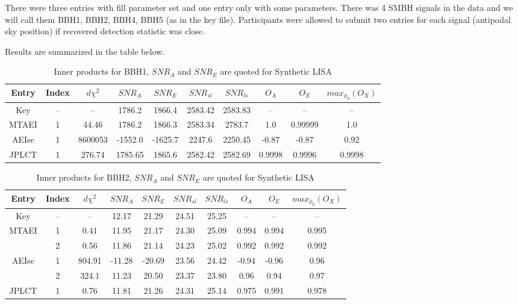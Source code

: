 \documentclass[prd,aps,amsfonts,amsmath, nofootinbib]{revtex4}
\begin{document}
There were three entries with fill parameter set and one entry only with 
some parameters.
There was 4 SMBH signals in the data and we will call them BBH1, BBH2, BBH4, BBH5
(as in the key file). Participants were allowed to submit two entries for
each signal (antipodal sky position) if recovered detection statistic was close.

Results are summarized in the table below.

\begin{table}
\caption{\label{BBH1} Inner products for BBH1, $SNR_A$ and $SNR_E$ are
quoted for Synthetic LISA}
\begin{ruledtabular}
\begin{tabular}{|c|c|c|c|c|c|c|c|c|c|}
Entry & Index & $d\chi^2$ & $SNR_A$ & $SNR_E$ & $SNR_{sl}$ & $SNR_{ls}$ & $O_A$ & $O_E$ & $max_{\phi_0}(O_X)$\\
\hline
Key & -- & -- & 1786.2 & 1866.4 & 2583.42 & 2583.83 & -- & -- & -- \\
\hline
MTAEI & 1 & 44.46 & 1786.2 & 1866.3 & 2583.34 & 2783.7 &1.0 & 0.99999 & 1.0   \\
\hline
AEIse & 1 & 8600053 & -1552.0 & -1625.7 & 2247.6 & 2250.45 &-0.87 & -0.87 &  0.92  \\
\hline
JPLCT & 1 & 276.74 & 1785.65 & 1865.6 & 2582.42 & 2582.69 & 0.9998   &  0.9996  & 0.9998 \\
\end{tabular}
\end{ruledtabular}
\end{table}

\begin{table}
\caption{\label{BBH2} Inner products for BBH2, $SNR_A$ and $SNR_E$ are
quoted for Synthetic LISA}
\begin{ruledtabular}
\begin{tabular}{|c|c|c|c|c|c|c|c|c|c|}
Entry & Index & $d\chi^2$ & $SNR_A$ & $SNR_E$ & $SNR_{sl}$ & $SNR_{ls}$  & $O_A$ & $O_E$ & $max_{\phi_0}(O_X)$\\
\hline
Key & -- & -- & 12.17 & 21.29 & 24.51 & 25.25 & -- & -- & -- \\
\hline
MTAEI & 1 & 0.41 & 11.95 & 21.17 & 24.30 & 25.09 &0.994 & 0.994 & 0.995 \\
      & 2 & 0.56 & 11.86 & 21.14 & 24.23 & 25.02 & 0.992 & 0.992 & 0.992 \\
\hline
AEIse & 1 & 804.91 & -11.28  & -20.69 & 23.56 & 24.42 & -0.94 & -0.96 & 0.96 \\
      & 2 & 324.1 & 11.23 & 20.50 & 23.37 & 23.80 & 0.96 & 0.94 & 0.97 \\
\hline
JPLCT & 1 & 0.76 & 11.81 & 21.26 & 24.31 & 25.14 & 0.975 & 0.991 & 0.978\\
\end{tabular}
\end{ruledtabular}
\end{table}
\end{document}
